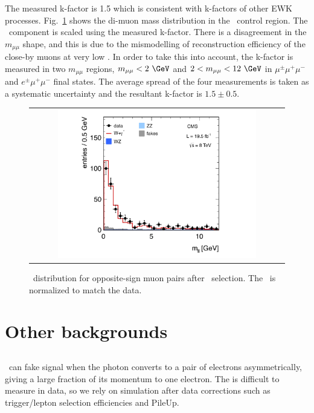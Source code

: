 The measured k-factor is 1.5 which is consistent with k-factors of other EWK processes. 
Fig.~\ref{fig:wg3l} shows the di-muon mass distribution in the \wgammastar\ control region.
The \wgammastar\ component is scaled using the measured k-factor. 
There is a disagreement in the $m_{\mu\mu}$ shape, and this is due to the mismodelling 
of reconstruction efficiency of the close-by muons at very low \pt. 
In order to take this into account, the k-factor is measured in two $m_{\mu\mu}$ regions, 
$m_{\mu\mu}<2~\GeV$ and $2<m_{\mu\mu}<12~\GeV$ in  $\mu^\pm\mu^+\mu^-$ and $e^\pm\mu^+\mu^-$ 
final states. The average spread of the four measurements is taken as a systematic uncertainty
and the resultant k-factor is $1.5 \pm 0.5$.

\begin{figure}[htp] 
\centering 
\begin{tabular}{c} 
\includegraphics[width=0.8\textwidth]{figures/Wg3l.pdf} 
\end{tabular} 
\caption{\mll\ distribution for opposite-sign muon pairs after \wgammastar\ selection. 
The \wgammastar\ is normalized to match the data.} 
\label{fig:wg3l} 
\end{figure} 


\section{ Other backgrounds } 

\subsection{\wgamma}

\wgamma\ can fake signal when the photon converts to a pair of electrons asymmetrically, 
giving a large fraction of its momentum to one electron. The is difficult to measure 
in data, so we rely on simulation after data corrections such as trigger/lepton selection 
efficiencies and PileUp.

